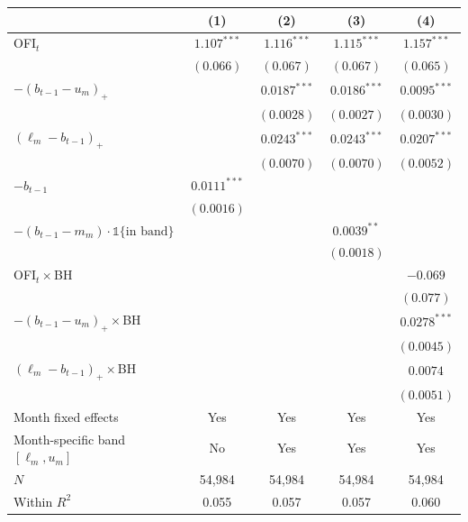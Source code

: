 \begin{tabular}{lcccc}
\toprule
 & (1) & (2) & (3) & (4) \\
\midrule
OFI$_t$ & $1.107^{***}$ & $1.116^{***}$ & $1.115^{***}$ & $1.157^{***}$ \\
 & $(0.066)$ & $(0.067)$ & $(0.067)$ & $(0.065)$ \\
$-(b_{t-1}-u_m)_+$ \;[$\kappa^+$] &  & $0.0187^{***}$ & $0.0186^{***}$ & $0.0095^{***}$ \\
 &  & $(0.0028)$ & $(0.0027)$ & $(0.0030)$ \\
$(\ell_m-b_{t-1})_+$ \;[$\kappa^-$] &  & $0.0243^{***}$ & $0.0243^{***}$ & $0.0207^{***}$ \\
 &  & $(0.0070)$ & $(0.0070)$ & $(0.0052)$ \\
$-b_{t-1}$  & $0.0111^{***}$ &  &  &  \\
 & $(0.0016)$ &  &  &  \\
$-(b_{t-1}-m_m)\cdot\mathbb 1\{\text{in band}\}$ &  &  & $0.0039^{**}$ &  \\
 &  &  & $(0.0018)$ &  \\
OFI$_t\times$BH &  &  &  & $-0.069$ \\
 &  &  &  & $(0.077)$ \\
$-(b_{t-1}-u_m)_+\times$BH &  &  &  & $0.0278^{***}$ \\
 &  &  &  & $(0.0045)$ \\
$(\ell_m-b_{t-1})_+\times$BH &  &  &  & $0.0074$ \\
 &  &  &  & $(0.0051)$ \\
\midrule
Month fixed effects & Yes & Yes & Yes & Yes \\
Month-specific band $[\ell_m,u_m]$ & No & Yes & Yes & Yes \\
$N$ & 54,984 & 54,984 & 54,984 & 54,984 \\
Within $R^2$ & 0.055 & 0.057 & 0.057 & 0.060 \\
\bottomrule
\end{tabular}
